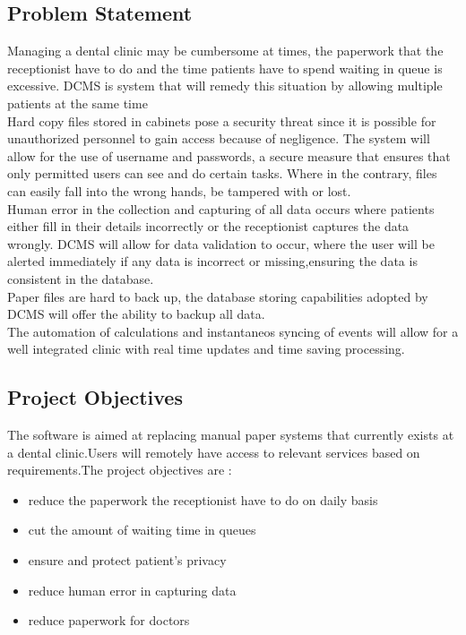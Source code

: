 \documentclass[11 pt]{article}
\begin{document}
\subsection{Problem Statement}
Managing a dental clinic may be cumbersome at times, the paperwork that the receptionist have to do and the time patients have to spend waiting in queue is excessive. DCMS is system that will remedy this situation by allowing multiple patients at the same time\\
Hard copy files stored in cabinets pose a security threat since it is possible for unauthorized personnel to gain access because of negligence. The system will allow for the use of username and passwords, a secure measure that ensures that only permitted users can see and do certain tasks. Where in the contrary, files can easily fall into the wrong hands, be tampered with or lost.\\
Human error in the collection and capturing of all data occurs where patients either fill in their details incorrectly or the receptionist captures the data wrongly. DCMS will allow for data validation to occur, where the user will be alerted immediately if any data is incorrect or missing,ensuring the data is consistent in the database.\\
Paper files are hard to back up, the database storing capabilities adopted by DCMS will offer the ability to backup all data. \\
The automation of calculations and instantaneos syncing of events will allow for a well integrated clinic with real time updates and time saving processing.\subsection{Project Objectives }
The software is aimed at replacing manual paper systems that currently exists at a dental clinic.Users will remotely have access to relevant services based on requirements.The project objectives are :
\begin{itemize}
\item reduce the paperwork the receptionist have to do on daily basis
\item cut the amount of waiting time in queues
\item ensure and protect patient's privacy
\item reduce human error in capturing data
\item reduce paperwork for doctors
\end{itemize}
\end{document}
